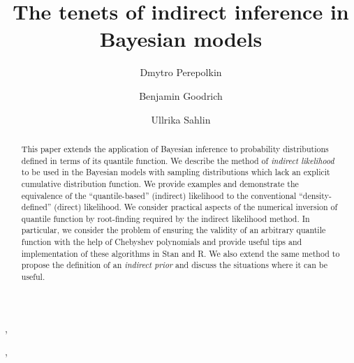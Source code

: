 \documentclass[ba]{imsart}
\numberwithin{equation}{section}
\theoremstyle{plain}
\begin{document}
\begin{frontmatter}

\title{The tenets of indirect inference in Bayesian models}

\begin{aug}
\author{Dmytro Perepolkin}, \author{Benjamin Goodrich}, \author{Ullrika Sahlin}

\address[lund]{Centre for Environmental and Climate Science, Lund University, Sölvegatan 37, 223 62 Lund, Sweden \ifstrequal{lund}{lund}{}{}
  \ifstrequal{lund}{lund}{}{}
} %
\address[columbia]{Applied Statistics Center, Columbia University, New York, NY \ifstrequal{columbia}{lund}{\printead{ea-1}}{}
  \ifstrequal{columbia}{lund}{\printead{ea-3}}{}
}%


\end{aug}

\begin{abstract}
This paper extends the application of Bayesian inference to probability distributions defined in terms of its quantile function. We describe the method of \emph{indirect likelihood} to be used in the Bayesian models with sampling distributions which lack an explicit cumulative distribution function. We provide examples and demonstrate the equivalence of the ``quantile-based'' (indirect) likelihood to the conventional ``density-defined'' (direct) likelihood. We consider practical aspects of the numerical inversion of quantile function by root-finding required by the indirect likelihood method. In particular, we consider the problem of ensuring the validity of an arbitrary quantile function with the help of Chebyshev polynomials and provide useful tips and implementation of these algorithms in Stan and R. We also extend the same method to propose the definition of an \emph{indirect prior} and discuss the situations where it can be useful.
\end{abstract}

 \begin{keyword}[class=MSC]
\end{keyword}
 \begin{keyword}   \end{keyword}
\end{frontmatter}
\end{document}
